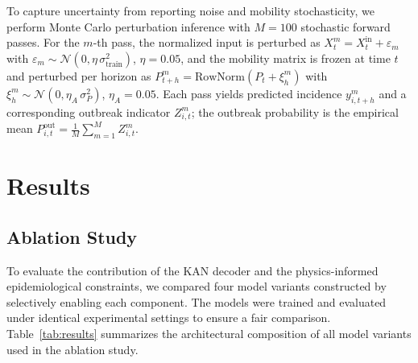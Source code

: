 \documentclass[10pt,letterpaper]{article}
\begin{document}
	To capture uncertainty from reporting noise and mobility stochasticity, we perform Monte Carlo perturbation inference with $M = 100$ stochastic forward passes. For the $m$-th pass, the normalized input is perturbed as $X_t^{m} = X_t^{\mathrm{in}} + \varepsilon_m$ with $\varepsilon_m \sim \mathcal{N}(0, \eta\,\sigma_{\mathrm{train}}^{2})$, $\eta = 0.05$, and the mobility matrix is frozen at time $t$ and perturbed per horizon as $P_{t+h}^{m} = \mathrm{RowNorm}(P_t + \xi_h^{m})$ with $\xi_h^{m} \sim \mathcal{N}(0, \eta_A\,\sigma_P^{2})$, $\eta_A = 0.05$. Each pass yields predicted incidence $y_{i,t+h}^{m}$ and a corresponding outbreak indicator $Z_{i,t}^{m}$; the outbreak probability is the empirical mean $P_{i,t}^{\mathrm{out}} = \frac{1}{M}\sum_{m=1}^{M} Z_{i,t}^{m}$.
	
	
	
	
	
	
	
	
	
	
	
	
	
	\section*{Results}
	\subsection*{Ablation Study}
	
	To evaluate the contribution of the KAN decoder and the physics-informed epidemiological constraints, we compared four model variants constructed by selectively enabling each component. The models were trained and evaluated under identical experimental settings to ensure a fair comparison. Table~\ref{tab:results} summarizes the architectural composition of all model variants used in the ablation study.
	
\end{document}
